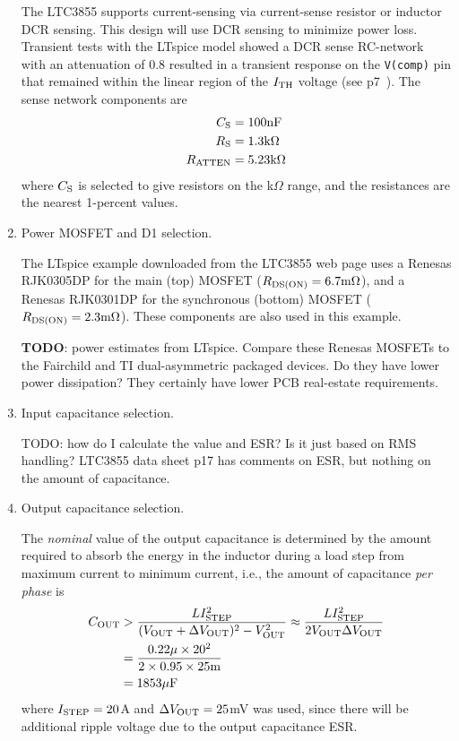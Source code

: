 \begin{enumerate}
The LTC3855 supports current-sensing via current-sense resistor or
inductor DCR sensing. This design will use DCR sensing to minimize
power loss. Transient tests with the LTspice model showed a DCR
sense RC-network with an attenuation of 0.8 resulted in a transient
response on the \verb+V(comp)+ pin that remained within the
linear region of the $I_{\rm TH}$ voltage 
(see p7~\cite{Linear_LTC3855_2009}). The sense network components
are
%
\begin{equation}
\begin{split}
C_{\rm S} &= 100\text{nF}\\
R_{\rm S} &= 1.3\text{k}\Omega\\
R_{\rm ATTEN} &= 5.23\text{k}\Omega
\end{split}
\end{equation}
%
where $C_{\rm S}$ is selected to give resistors on the k$\Omega$
range, and the resistances are the nearest 1-percent values.

\item Power MOSFET and D1 selection.

The LTspice example downloaded from the LTC3855 web page uses a
Renesas RJK0305DP for the main (top) MOSFET 
($R_{\rm DS(ON)} = 6.7\text{m}\Omega$), and a Renesas RJK0301DP
for the synchronous (bottom) MOSFET ($R_{\rm DS(ON)} = 2.3\text{m}\Omega$).
These components are also used in this example.

{\bf TODO}: power estimates from LTspice. Compare these
Renesas MOSFETs to the Fairchild and TI dual-asymmetric packaged
devices. Do they have lower power dissipation? They certainly
have lower PCB real-estate requirements.

\item Input capacitance selection.

TODO: how do I calculate the value and ESR? Is it just based on
RMS handling? LTC3855 data sheet p17 has comments on ESR, but
nothing on the amount of capacitance.

\item Output capacitance selection.

The {\em nominal} value of the output capacitance is determined by 
the amount required to absorb the energy in the inductor during a
load step from maximum current to minimum current, i.e., the amount
of capacitance {\em per phase} is
%
\begin{equation}
\begin{split}
C_{\rm OUT} &> \frac{LI_{\rm STEP}^2}
{(V_{\rm OUT} + \Delta V_{\rm OUT})^2 - V_{\rm OUT}^2} 
\approx \frac{LI_{\rm STEP}^2}{2V_{\rm OUT}\Delta V_{\rm OUT}}\\
&= \frac{0.22\mu\times 20^2}{2\times0.95\times25\text{m}}\\
&= 1853\mu\text{F}
\end{split}
\end{equation}
%
where $I_{\rm STEP}=20$A and $\Delta V_{\rm OUT} = 25$mV was
used, since there will be additional ripple voltage due to 
the output capacitance ESR.


\end{enumerate}
